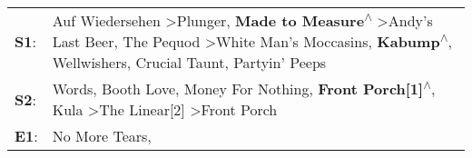 \begin{supertabular}{p{0.03\textwidth}p{0.92\textwidth}}
 \textbf{S1}:  &  Auf Wiedersehen\textsuperscript{} \textgreater \enspace Plunger\textsuperscript{}, \enspace \textbf{Made to Measure\textsuperscript{$\wedge$}} \textgreater \enspace Andy's Last Beer\textsuperscript{}, \enspace The Pequod\textsuperscript{} \textgreater \enspace White Man's Moccasins\textsuperscript{}, \enspace \textbf{Kabump\textsuperscript{$\wedge$}}, \enspace Wellwishers\textsuperscript{}, \enspace Crucial Taunt\textsuperscript{}, \enspace Partyin' Peeps\textsuperscript{}  \enspace  \\
 \textbf{S2}:  &                                                                                                                                                                            Words\textsuperscript{}, \enspace Booth Love\textsuperscript{}, \enspace Money For Nothing\textsuperscript{}, \enspace \textbf{Front Porch[1]\textsuperscript{$\wedge$}}, \enspace Kula\textsuperscript{} \textgreater \enspace The Linear[2]\textsuperscript{} \textgreater \enspace Front Porch\textsuperscript{}  \enspace  \\
 \textbf{E1}:  &                                                                                                                                                                                                                                                                                                                                                                                                                               No More Tears\textsuperscript{}, \textsuperscript{}  \enspace  \\
\end{supertabular}
